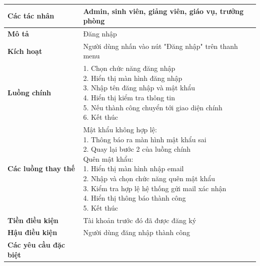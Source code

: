 \begin{tabular}{|l|l|}
	\hline
	\textbf{Các tác nhân}         & Admin, sinh viên, giảng viên, giáo vụ, trưởng phòng \\
	\hline
	\textbf{Mô tả}                & Đăng nhập                                           \\
	\hline
	\textbf{Kích hoạt}            & Người dùng nhấn vào nút "Đăng nhập" trên thanh menu \\
	\hline
	\textbf{Luồng chính}          & \makecell[l]{1. Chọn chức năng đăng nhập            \\ 2. Hiển thị màn hình đăng nhập \\ 3. Nhập tên đăng nhập và mật khẩu \\ 4. Hiển thị kiểm tra thông tin \\ 5. Nếu thành công chuyển tới giao diện chính \\ 6. Kết thúc} \\
	\hline
	\textbf{Các luồng thay thế}   & \makecell[l]{Mật khẩu không hợp lệ:                 \\ 1. Thông báo ra màn hình mật khẩu sai \\ 2. Quay lại bước 2 của luồng chính \\ Quên mật khẩu: \\ 1. Hiển thị màn hình nhập email \\ 2. Nhập và chọn chức năng quên mật khẩu \\ 3. Kiểm tra hợp lệ hệ thống gửi mail xác nhận \\ 4. Hiển thị thông báo thành công \\ 5. Kết thúc} \\
	\hline
	\textbf{Tiền điều kiện}       & Tài khoản trước đó đã được đăng ký                  \\
	\hline
	\textbf{Hậu điều kiện}        & Người dùng đăng nhập thành công                     \\
	\hline
	\textbf{Các yêu cầu đặc biệt} &                                                     \\
	\hline
\end{tabular}

